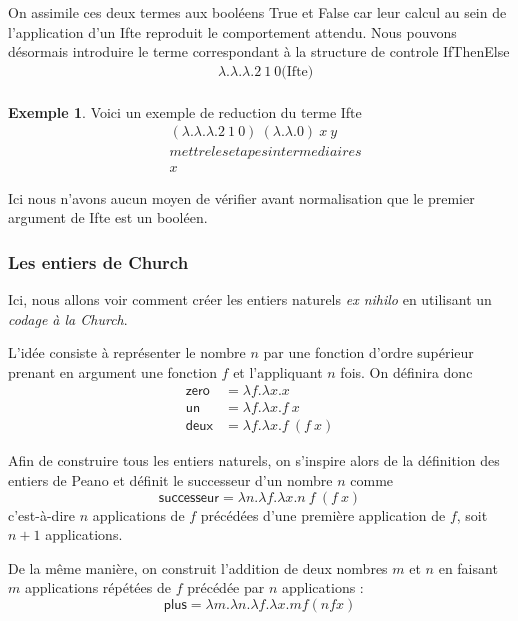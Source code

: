 \documentclass {article}
\theoremstyle{definition}
\newtheorem{example}{Exemple}
\theoremstyle{remark}
\begin{document}
On assimile ces deux termes aux booléens True et False car leur calcul au sein
de l'application d'un Ifte reproduit le comportement attendu.
Nous pouvons désormais introduire le terme correspondant à la structure de 
controle IfThenElse 
\begin{align*}
  &\lambda .\lambda .\lambda . 2\: 1\: 0 \mbox{(Ifte)} \\
\end{align*}

\begin{example}
  Voici un exemple de reduction du terme Ifte
  \begin{align*}
    &(\lambda .\lambda .\lambda . 2\: 1\: 0) \: (\lambda . \lambda . 0) \: x \: y  \\
    & mettre les etapes intermediaires \\
    & x 
  \end{align*}
\end{example}

Ici nous n'avons aucun moyen de vérifier avant normalisation que le premier
argument de Ifte est un booléen. %

\subsubsection{Les entiers de Church}

Ici, nous allons voir comment créer
les entiers naturels \textit{ex nihilo} en utilisant un \emph{codage à
  la Church}.

L'idée consiste à représenter le nombre \(n\) par une fonction d'ordre
supérieur prenant en argument une fonction \(f\) et l'appliquant \(n\)
fois. On définira donc 
%
\begin{align*}
\mathsf{zero} &= \lambda f. \lambda x. x \\
\mathsf{un}   &= \lambda f. \lambda x. f\: x \\
\mathsf{deux} &= \lambda f. \lambda x. f\: (f\: x)
\end{align*}

Afin de construire tous les entiers naturels, on s'inspire alors de la
définition des entiers de Peano et définit le successeur d'un nombre \(n\)
comme
%
\[
\mathsf{successeur} = \lambda n. \lambda f. \lambda x. n\: f\: (f\: x)
\]
%
c'est-à-dire \(n\) applications de \(f\) précédées d'une première
application de \(f\), soit \(n+1\) applications.

De la même manière, on construit l'addition de deux nombres \(m\) et
\(n\) en faisant \(m\) applications répétées de \(f\) précédée par
\(n\) applications :
%
\[
\mathsf{plus} = \lambda m. \lambda n. \lambda f. \lambda x. m f (n f x)
\]
\end{document}
